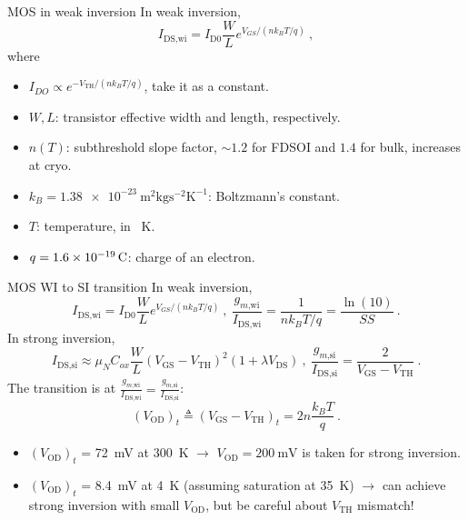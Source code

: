 \documentclass[aspectratio=169, t, 9pt]{beamer} %
\begin{document}
\begin{frame}{MOS in weak inversion}
    In weak inversion,
\begin{equation}
    I_\text{DS,wi} = I_\text{D0} \frac{W}{L} e^{V_{GS} / \left(n k_B T / q\right)} \ ,
    \label{eq:Id_wi}
\end{equation}
where
\begin{itemize}
    \item $I_{DO} \propto e^{-V_\text{TH} / \left(n k_B T / q\right)}$, take it as a constant.
    \item $W, L$: transistor effective width and length, respectively.
    \item $n(T)$: subthreshold slope factor, $\sim 1.2$ for FDSOI and $1.4$ for bulk, increases at cryo.
    \item $k_B = \SI{1.38e-23}{\m\squared\kg\s\tothe{-2}\K\tothe{-1}}$: Boltzmann's constant.
    \item $T$: temperature, in \SI{}{\K}.
    \item $q = \SI{1.6e-19}{\C}$: charge of an electron.
\end{itemize}
\end{frame}

\begin{frame}{MOS WI to SI transition \cite{Sansen2006}}
In weak inversion,
\begin{equation}
    I_\text{DS,wi} = I_\text{D0} \frac{W}{L} e^{V_{GS} / \left(n k_B T / q\right)} \ , \ \frac{g_{m\text{,wi}}}{I_\text{DS,wi}} = \frac{1}{n k_B T / q} = \frac{\ln(10)}{SS}  \ .
\end{equation}
In strong inversion,
\begin{equation}
    I_\text{DS,si} \approx \mu_N C_{ox} \frac{W}{L} \left(V_\text{GS} - V_\text{TH}\right)^2 \left(1 + \lambda V_\text{DS} \right) \ , \ \frac{g_{m\text{,si}}}{I_\text{DS,si}} = \frac{2}{V_\text{GS} - V_\text{TH}} \ .
\end{equation}
The transition is at $ \frac{g_{m\text{,wi}}}{I_\text{DS,wi}} = \frac{g_{m\text{,si}}}{I_\text{DS,si}}$:
\begin{equation}
    \left( V_\text{OD} \right)_t \triangleq \left( V_\text{GS} - V_\text{TH} \right)_t = 2 n \frac{k_B T}{q} \ .
\end{equation}
\vspace{-0.6cm}
\begin{itemize}
    \item $\left( V_\text{OD} \right)_t$ = \SI{72}{\mV} at \SI{300}{\K} $\rightarrow$ $V_\text{OD} = \SI{200}{\mV}$ is taken for strong inversion.
    \item $\left( V_\text{OD} \right)_t$ = \SI{8.4}{\mV} at \SI{4}{\K} (assuming saturation at \SI{35}{\K}) $\rightarrow$ can achieve strong inversion with small $V_\text{OD}$, but be careful about $V_\text{TH}$ mismatch!
\end{itemize}
\end{frame}
\end{document}
